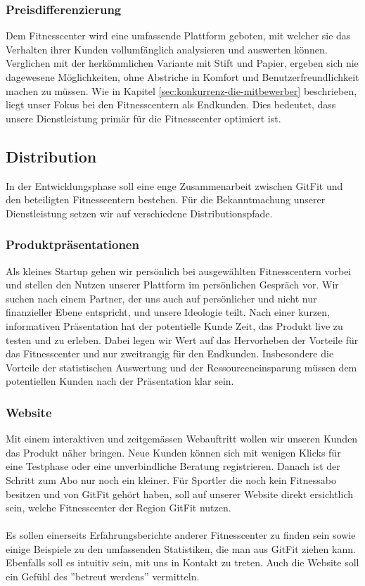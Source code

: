 \subsubsection{Preisdifferenzierung}
Dem Fitnesscenter wird eine umfassende Plattform geboten, mit welcher sie das Verhalten ihrer Kunden vollumfänglich analysieren und auswerten können. Verglichen mit der herkömmlichen Variante mit Stift und Papier, ergeben sich nie dagewesene Möglichkeiten, ohne Abstriche in Komfort und Benutzerfreundlichkeit machen zu müssen. Wie in Kapitel \ref{sec:konkurrenz-die-mitbewerber} beschrieben, liegt unser Fokus bei den Fitnesscentern als Endkunden. Dies bedeutet, dass unsere Dienstleistung primär für die Fitnesscenter optimiert ist.

\subsection{Distribution}
In der Entwicklungsphase soll eine enge Zusammenarbeit zwischen GitFit und den beteiligten Fitnesscentern bestehen. Für die Bekanntmachung unserer Dienstleistung setzen wir auf verschiedene Distributionspfade. 

\subsubsection{Produktpräsentationen}
Als kleines Startup gehen wir persönlich bei ausgewählten Fitnesscentern vorbei und stellen den Nutzen unserer Plattform im persönlichen Gespräch vor. Wir suchen nach einem Partner, der uns auch auf persönlicher und nicht nur finanzieller Ebene entspricht, und unsere Ideologie teilt. Nach einer kurzen, informativen Präsentation hat der potentielle Kunde Zeit, das Produkt live zu testen und zu erleben. Dabei legen wir Wert auf das Hervorheben der Vorteile für das Fitnesscenter und nur zweitrangig für den Endkunden. Insbesondere die Vorteile der statistischen Auswertung und der Ressourceneinsparung müssen dem potentiellen Kunden nach der Präsentation klar sein.

\subsubsection{Website} 
Mit einem interaktiven und zeitgemässen Webauftritt wollen wir unseren Kunden das Produkt näher bringen. Neue Kunden können sich mit wenigen Klicks für eine Testphase oder eine unverbindliche Beratung registrieren. Danach ist der Schritt zum Abo nur noch ein kleiner. Für Sportler die noch kein Fitnessabo besitzen und von GitFit gehört haben, soll auf unserer Website direkt ersichtlich sein, welche Fitnesscenter der Region GitFit nutzen.
\\ \\
Es sollen einerseits Erfahrungsberichte anderer Fitnesscenter zu finden sein sowie einige Beispiele zu den umfassenden Statistiken, die man aus GitFit ziehen kann. Ebenfalls soll es intuitiv sein, mit uns in Kontakt zu treten. Auch die Website soll ein Gefühl des ''betreut werdens'' vermitteln.

